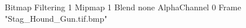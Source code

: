 {Bitmap
	{Filtering 1}
	{Mipmap 1}
	{Blend none}
	{AlphaChannel 0}
	{Frame "Stag_Hound_Gun.tif.bmp"}
}
